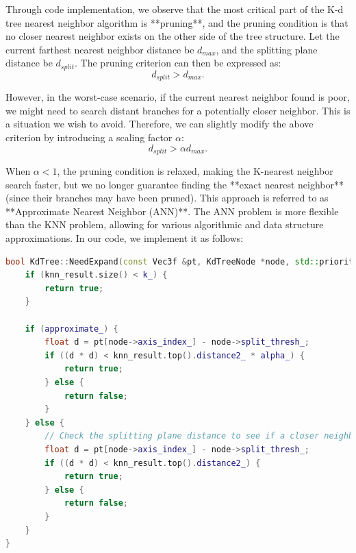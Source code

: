 Through code implementation, we observe that the most critical part of the K-d tree nearest neighbor algorithm is **pruning**, and the pruning condition is that no closer nearest neighbor exists on the other side of the tree structure. Let the current farthest nearest neighbor distance be $d_{max}$, and the splitting plane distance be $d_{split}$. The pruning criterion can then be expressed as:  
\begin{equation}\label{key}  
	d_{split} > d_{max}.  
\end{equation}  

However, in the worst-case scenario, if the current nearest neighbor found is poor, we might need to search distant branches for a potentially closer neighbor. This is a situation we wish to avoid. Therefore, we can slightly modify the above criterion by introducing a scaling factor $\alpha$:  
\begin{equation}\label{key}  
	d_{split} > \alpha d_{max}.  
\end{equation}  

When $\alpha < 1$, the pruning condition is relaxed, making the K-nearest neighbor search faster, but we no longer guarantee finding the **exact nearest neighbor** (since their branches may have been pruned). This approach is referred to as **Approximate Nearest Neighbor (ANN)**. The ANN problem is more flexible than the KNN problem, allowing for various algorithmic and data structure approximations. In our code, we implement it as follows:  

\begin{lstlisting}[language=c++,caption=src/ch5/kdtree.cc]  
bool KdTree::NeedExpand(const Vec3f &pt, KdTreeNode *node, std::priority_queue<NodeAndDistance> &knn_result) const {  
	if (knn_result.size() < k_) {  
		return true;  
	}  
	
	if (approximate_) {  
		float d = pt[node->axis_index_] - node->split_thresh_;  
		if ((d * d) < knn_result.top().distance2_ * alpha_) {  
			return true;  
		} else {  
			return false;  
		}  
	} else {  
		// Check the splitting plane distance to see if a closer neighbor exists  
		float d = pt[node->axis_index_] - node->split_thresh_;  
		if ((d * d) < knn_result.top().distance2_) {  
			return true;  
		} else {  
			return false;  
		}  
	}  
}  
\end{lstlisting}  

